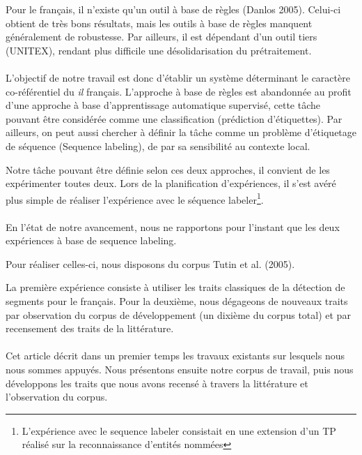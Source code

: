 \documentclass[a4paper,12pt]{article}
\begin{document}
Pour le français, il n'existe qu'un outil à base de règles (Danlos 2005). Celui-ci obtient de très bons résultats, mais les outils à base de règles manquent généralement de robustesse. Par ailleurs, il est dépendant d'un outil tiers (UNITEX), rendant plus difficile une désolidarisation du prétraitement. 

\paragraph{}
L'objectif de notre travail est donc d'établir un système déterminant le caractère co-référentiel du \og{}\textit{il}\fg{} français. L'approche à base de règles est abandonnée au profit d'une approche à base d'apprentissage automatique supervisé, cette tâche pouvant être considérée comme une classification (prédiction d'étiquettes). Par ailleurs, on peut aussi chercher à définir la tâche comme un problème d'étiquetage de séquence (Sequence labeling), de par sa sensibilité au contexte local.

Notre tâche pouvant être définie selon ces deux approches, il convient de les expérimenter toutes deux. Lors de la planification d'expériences, il s'est avéré plus simple de réaliser l'expérience avec le séquence labeler\footnote{L'expérience avec le sequence labeler consistait en une extension d'un TP réalisé sur la reconnaissance d'entités nommées}.

\paragraph{}
En l'état de notre avancement, nous ne rapportons pour l'instant que les deux expériences à base de sequence labeling.

Pour réaliser celles-ci, nous disposons du corpus Tutin et al. (2005). 

La première expérience consiste à utiliser les traits classiques de la détection de segments pour le français. Pour la deuxième, nous dégageons de nouveaux traits par observation du corpus de développement (un dixième du corpus total) et par recensement des traits de la littérature.

\paragraph{}
Cet article décrit dans un premier temps les travaux existants sur lesquels nous nous sommes appuyés. Nous présentons ensuite notre corpus de travail, puis nous développons les traits que nous avons recensé à travers la littérature et l'observation du corpus.
\end{document}
